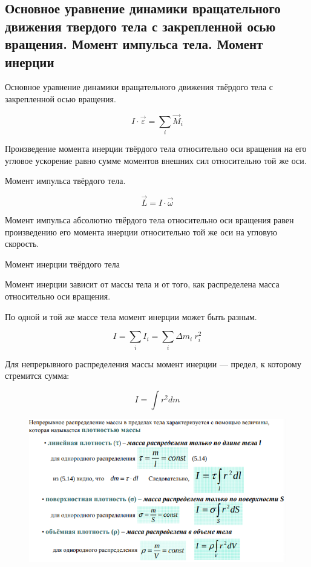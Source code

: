\subsection{Основное уравнение динамики вращательного движения твердого тела с закрепленной осью вращения. Момент импульса тела. Момент инерции}

\begin{definition}
    Основное уравнение динамики вращательного движения твёрдого тела с закрепленной осью вращения.

    $$I\cdot\vec\varepsilon=\sum_i\vec M_i$$

    Произведение момента инерции твёрдого тела относительно оси вращения на его угловое ускорение равно сумме моментов внешних сил относительно той же оси.
\end{definition}

\begin{definition}
    Момент импульса твёрдого тела.

    $$\vec L=I\cdot\vec\omega$$

    Момент импульса абсолютно твёрдого тела относительно оси вращения равен произведению его момента инерции относительно той же оси на угловую скорость.
\end{definition}

\begin{definition}
    Момент инерции твёрдого тела 

    Момент инерции зависит от массы тела и от того, как распределена масса относительно оси вращения.

    По одной и той же массе тела момент инерции может быть разным.

    $$I=\sum_iI_i=\sum_i\Delta m_i\ r_i^2$$

    Для непрерывного распределения массы момент инерции — предел, к которому стремится сумма:

    $$I=\int r^2dm$$
\end{definition}

\begin{figure}[h]
    \centering
    \includegraphics[width=0.7\linewidth]{imgs/q9i1.png}
\end{figure}